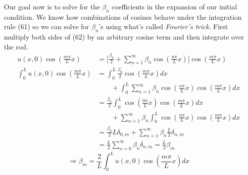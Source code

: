 \documentclass[a4paper, 11pt]{article}
\newenvironment{solution}{%
	\begin{list}{}{%
			\setlength{\topsep}{0pt}%
			\setlength{\leftmargin}{0.5cm}%
			\setlength{\rightmargin}{0.5cm}%
			\setlength{\listparindent}{\parindent}%
			\setlength{\itemindent}{\parindent}%
			\setlength{\parsep}{\parskip}%
		}%
		\item[]}{\end{list}}
\begin{document}
\begin{enumerate}[leftmargin=0em]
\begin{solution}
        Our goal now is to solve for the $\beta_n$ coefficients in the
        expansion of our initial condition. We know how combinations
        of cosines behave under the integration rule (61) so we can solve for
        $\beta_n$'s using what's called \textit{Fourier's trick}. First multiply
        both sides of (62) by an arbitrary cosine term and then integrate over
        the rod.  
        \begin{align}
          u(x,0)\cos\left( \frac{m\pi}{L}x \right) &= \Bigg[ \frac{\beta_0}{2} +\sum\limits_{n=1}^\infty\beta_n \cos\left( \frac{n\pi}{L}x \right)\Bigg]\cos\left( \frac{m\pi}{L}x \right)\\
          \int_0^Lu(x,0)\cos\left( \frac{m \pi}{L}x \right) &= \int_0^L\frac{\beta_0}{2}\cos\left( \frac{m\pi}{L}x \right)dx\\
                                                   &\hspace{2em}+ \int_0^L\sum\limits_{n=1}^\infty \beta_n\cos\left(\frac{n\pi}{L}x \right)\cos\left( \frac{m\pi}{L}x \right)dx \\
                                                   &= \frac{\beta_0}{2}\int_0^L\cos\left( \frac{0\pi}{L}x \right)\cos\left( \frac{m\pi}{L}x \right)dx \\
                                                   &\hspace{2em}+\sum\limits_{n=1}^\infty\beta_n\int_0^L\cos\left( \frac{n\pi}{L}x \right)\cos\left( \frac{m\pi}{L}x \right)dx  \\
                                                   &= \frac{\beta_0}{2}L\delta_{0,m}+\sum\limits_{n=1}^\infty\beta_n\frac{L}{2}\delta_{n,m} \\
                                                   &= \frac{L}{2}\sum\limits_{n=0}^\infty \beta_n\delta_{n,m} = \frac{L}{2}\beta_m 
        \end{align}
        \begin{equation}
        \Rightarrow\boxed{\beta_m = \frac{2}{L}\int_0^Lu(x,0)\cos\left( \frac{m\pi}{L}x \right)dx} 
        \end{equation}
        


\end{solution}
\end{enumerate}
\end{document}
